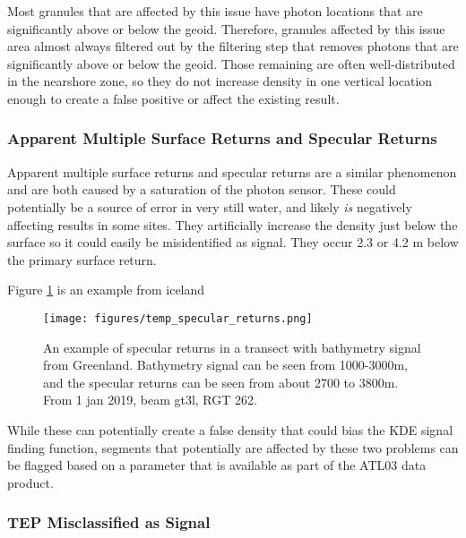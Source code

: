 Most granules that are affected by this issue have photon locations that are significantly above or below the geoid. Therefore, granules affected by this issue area almost always filtered out by the filtering step that removes photons that are significantly above or below the geoid. Those remaining are often well-distributed in the nearshore zone, so they do not increase density in one vertical location enough to create a false positive or affect the existing result. 

\subsubsection{Apparent Multiple Surface Returns and Specular Returns}

Apparent multiple surface returns and specular returns are a similar phenomenon and are both caused by a saturation of the photon sensor. These could potentially be a source of error in very still water, and likely \emph{is} negatively affecting results in some sites. They artificially increase the density just below the surface so it could easily be misidentified as signal. They occur 2.3 or 4.2 m below the primary surface return. 

Figure \ref{fig:multiple-surf-returns} is an example from iceland 

\begin{figure}[h!]
    \centering
    \texttt{[image: figures/temp\_specular\_returns.png]}
    \caption{An example of specular returns in a transect with bathymetry signal from Greenland. Bathymetry signal can be seen from 1000-3000m, and the specular returns can be seen from about 2700 to 3800m. From 1 jan 2019, beam gt3l, RGT 262.}
    \label{fig:multiple-surf-returns}
\end{figure}

While these can potentially create a false density that could bias the KDE signal finding function, segments that potentially are affected by these two problems can be flagged based on a parameter that is available as part of the ATL03 data product. 

\subsubsection{TEP Misclassified as Signal}

